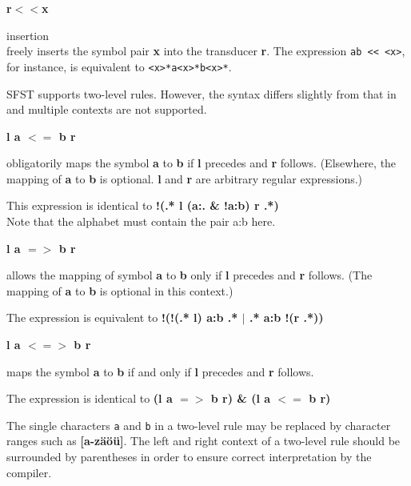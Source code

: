 \documentclass{article}
\begin{document}
\parbox[t]{1cm}{\textbf{r{\small $<<$}x}}
\begin{minipage}[t]{13cm}
  insertion\\
  freely inserts the symbol pair \textbf{x} into the transducer
  \textbf{r}. The expression \verb#ab << <x>#, for instance, is
  equivalent to \verb#<x>*a<x>*b<x>*#.\\
\end{minipage}

\noindent

SFST supports two-level rules. However, the syntax differs slightly
from that in \cite{Koskenniemi:83} and multiple contexts are
not supported.\\

\parbox[t]{2.5cm}{\textbf{l a $<=$ b r}}
\begin{minipage}[t]{11.5cm}
  obligatorily maps the symbol \textbf{a} to \textbf{b} if \textbf{l}
  precedes and \textbf{r} follows. (Elsewhere, the mapping of
  \textbf{a} to \textbf{b} is optional. \textbf{l} and \textbf{r} are
  arbitrary regular expressions.)
  
  This expression is identical to \textbf{!(.* l (a:. \& !a:b) r
    .*)}\\
  Note that the alphabet must contain the pair a:b here.
\end{minipage}
  
\parbox[t]{2.5cm}{\textbf{l a $=>$ b r}}
\begin{minipage}[t]{11.5cm}
  allows the mapping of symbol \textbf{a} to \textbf{b} only if
  \textbf{l} precedes and \textbf{r} follows. (The mapping of
  \textbf{a} to \textbf{b} is optional in this context.)
  
  The expression is equivalent to \textbf{!(!(.* l) a:b .* $|$ .* a:b
    !(r .*))}\\
\end{minipage}
  
\parbox[t]{2.5cm}{\textbf{l a $<=>$ b r}}
\begin{minipage}[t]{11.5cm}
  maps the symbol \textbf{a} to \textbf{b} if and only if \textbf{l}
  precedes and \textbf{r} follows.

  The expression is identical to \textbf{(l a $=>$ b r) \& (l a $<=$ b r)}\\
\end{minipage}

The single characters \texttt{a} and \texttt{b} in a two-level rule
may be replaced by character ranges such as
\textbf{[a-z{\"a}{\"o}{\"u}]}. The left and right context of a
two-level rule should be surrounded by parentheses in order to ensure
correct interpretation by the compiler.
\end{document}
